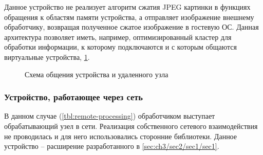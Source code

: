 Данное устройство не реализует алгоритм сжатия JPEG картинки в функциях обращения
к областям памяти устройства, а отправляет изображение внешнему обработчику,
возвращая полученное сжатое изображение в гостевую ОС.
Данная архитектура позволяет иметь, например, оптимизированный
кластер для обработки информации, к которому подключаются и с
которым общаются виртуальные устройства, \cref{fig:remote-processing}.

\begin{figure}[!htbp]
    \centering
    \caption{Схема общения устройства и удаленного узла}\label{fig:remote-processing}
\end{figure}

\subsubsection{Устройство, работающее через сеть}\label{sec:ch3/sec2/sec2/sec1}

В данном случае (\cref{tbl:remote-processing}) обработчиком выступает обрабатывающий узел в сети.
Реализация собственного сетевого взаимодействия не проводилась
и для него использовались сторонние библиотеки.
Данное устройство -- расширение разработанного в \cref{sec:ch3/sec2/sec1/sec1}.

